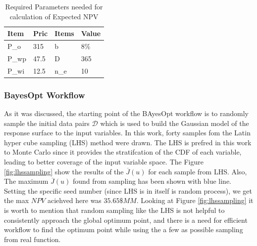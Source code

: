 \documentclass[]{elsarticle} %
\begin{document}
\begin{table}[H]

\caption{\label{tab:npvparam}Required Parameters needed for calculation of Expected NPV}
\centering
\begin{tabu} to 
\hline
Item & Pric & Items & Value\\
\hline
P\_o & 315 & b & 8\%\\
\hline
P\_wp & 47.5 & D & 365\\
\hline
P\_wi & 12.5 & n\_e & 10\\
\hline
\end{tabu}
\end{table}

\hypertarget{bayesopt-workflow}{%
\subsubsection{BayesOpt Workflow}\label{bayesopt-workflow}}

As it was discussed, the starting point of the BAyesOpt workflow is to randomly sample the initial data pairs \(\mathcal{D}\) which is used to build the Gaussian model of the response surface to the input variables. In this work, forty samples fom the Latin hyper cube sampling (LHS) method were drawn. The LHS is prefred in this work to Monte Carlo since it provides the stratifcation of the CDF of each variable, leading to better coverage of the input variable space. The Figure \ref{fig:lhssampling} show the results of the \(\overline{J}(u)\) for each sample from LHS. Also, The maximum \(\overline{J}(u)\) found from sampling has been shown with blue line. Setting the specific seed number (since LHS is in itself is random process), we get the max \(NPV\) aciehved here was \(35.65 \$MM\). Looking at Figure \ref{fig:lhssampling} it is worth to mention that random sampling like the LHS is not helpful to consistently approach the global optimum point, and there is a need for efficient workflow to find the optimum point while using the a few as possible sampling from real function.
\end{document}
